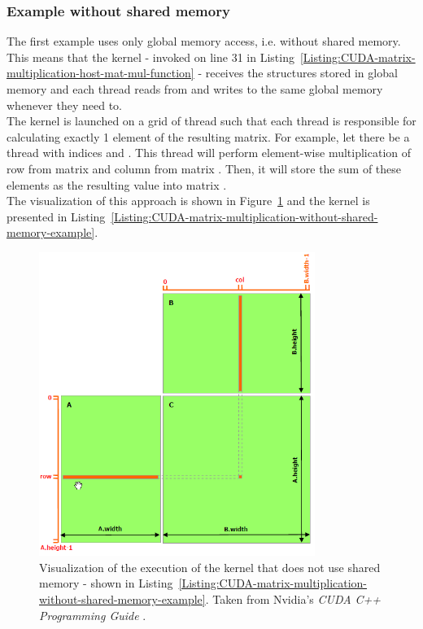 \subsubsection{Example without shared memory \TO}
The first example uses only global memory access, i.e. without shared memory. This means that the kernel - invoked on line 31 in Listing~\ref{Listing:CUDA-matrix-multiplication-host-mat-mul-function} - receives the  structures stored in global memory and each thread reads from and writes to the same global memory whenever they need to. \\
The kernel is launched on a grid of thread such that each thread is responsible for calculating exactly 1 element of the resulting  matrix. For example, let there be a thread with indices  and . This thread will perform element-wise multiplication of row  from matrix  and column  from matrix . Then, it will store the sum of these elements as the resulting value  into matrix . \\
The visualization of this approach is shown in Figure~\ref{Figure:CUDA-matrix-multiplication-without-shared-memory-example} and the kernel is presented in Listing~\ref{Listing:CUDA-matrix-multiplication-without-shared-memory-example}.

\begin{figure}[h!]
	\centering
	\includegraphics[width=0.8\textwidth, keepaspectratio]{images/ch1/CUDA-matrix-multiplication-without-shared-memory.png}
	\caption{Visualization of the execution of the kernel that does not use shared memory - shown in Listing~\ref{Listing:CUDA-matrix-multiplication-without-shared-memory-example}. Taken from Nvidia's \emph{CUDA C++ Programming Guide} \cite{NVIDIAMay2022}.}
	\label{Figure:CUDA-matrix-multiplication-without-shared-memory-example}
\end{figure}

